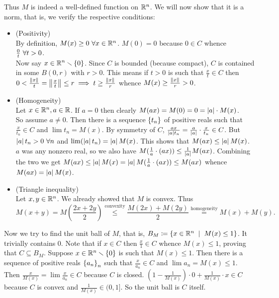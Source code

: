 \begin{enumerate}[leftmargin=*]
Thus $M$ is indeed a well-defined function on $\mathbb{R}^{n}$. We will now show that it is a norm, that is, we verify the respective conditions:
\begin{itemize}
\item (Positivity)\\
By definition, $M(x)\ge0~\forall x\in \mathbb{R}^{n}$. $M(0)=0$ because $0\in C$ whence $\frac{0}{t}~\forall t>0$.  \\Now say $\displaystyle x\in \mathbb{R}^{n}\smallsetminus\left\{0\right\}$. Since $C$ is bounded (because compact), $C$ is contained in some $B(0,r)$ with $r>0$. This means if $t>0$ is such that $\frac{x}{t}\in C$ then $0 < \frac{\left\lVert x \right\rVert_{}}{t}=\left\lVert \frac{x}{t} \right\rVert_{} \le r \implies t \ge \frac{\left\lVert x \right\rVert_{}}{r}$ whence $M(x) \ge \frac{\left\lVert x \right\rVert_{}}{r} > 0$.
\item (Homogeneity)\\
Let $x\in\mathbb{R}^{n},a\in\mathbb{R}$. If $a=0$ then clearly $M(ax) = M(0) = 0 = \left| a \right|\cdot M(x)$. \\
So assume $a\ne 0$. Then there is a sequence $\left\{t_{n}\right\}$ of positive reals such that $\frac{x}{t_{n}}\in C$ and $\lim t_{n} = M(x)$. By symmetry of $C$, $\frac{ax}{\left| a \right|t_{n}} = \frac{a}{\left| a \right|}\cdot\frac{x}{t_{n}}\in C$. But $\left| a \right|t_{n}>0~\forall n$ and $\lim (\left| a \right|t_{n}) = \left| a \right| M(x)$. This shows that $M(ax)\le \left| a \right| M(x)$. $a$ was any nonzero real, so we also have $M(\frac{1}{a}\cdot (ax))\le \frac1{\left| a \right|} M(ax)$. Combining the two we get $M(ax) \le \left| a \right| M(x) = \left| a \right| M(\frac{1}{a}\cdot (ax))\le M(ax)$ whence $M(ax) = \left| a \right|M(x)$.
\item (Triangle inequality)\\
Let $x,y\in\mathbb{R}^{n}$. We already showed that $M$ is convex. Thus $$M(x+y) = M\left(\frac{2x+2y}{2}\right) \stackrel{\text{convexity}}{\le} \frac{M(2x)+M(2y)}{2} \stackrel{\text{homogeneity}}{=} M(x) + M(y).$$

\end{itemize}

Now we try to find the unit ball of $M$, that is, $B_{M}\sett\set{x\in\R^{n}\st M(x)\le 1}$. It trivially contains $0$. Note that if $x\in C$ then $\frac x1\in C$ whence $M(x) \le 1$, proving that $C\subseteq B_{M}$. Suppose $x\in \mathbb{R}^{n}\smallsetminus\left\{0\right\}$ is such that $M(x)\le 1$. Then there is a sequence of positive reals $\left\{a_{n}\right\}_{n}$ such that $\frac{x}{a_{n}}\in C$ and $\lim a_{n} = M(x) \le 1$. Then $\frac{x}{M(x)} = \lim \frac{x}{a_{n}} \in C$ because $C$ is closed. $(1-\frac{1}{M(x)})\cdot 0 + \frac{1}{M(x)}\cdot x \in C$ because $C$ is convex and $\frac{1}{M(x)}\in (0,1]$. So the unit ball is $C$ itself.


\end{enumerate}
